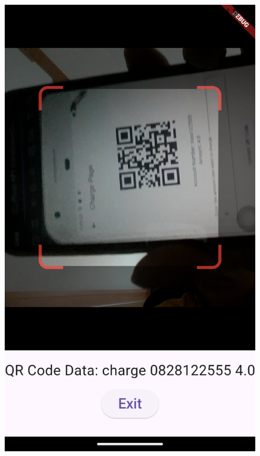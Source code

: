 \documentclass[a4paper,12pt,twoside]{ThesisStyle}
\begin{document}
\begin{figure}[h]
\begin{minipage}{0.31\textwidth}
        \includegraphics[width=\linewidth]{imatges/scanQR.png}

\end{minipage}
\end{figure}
\end{document}
